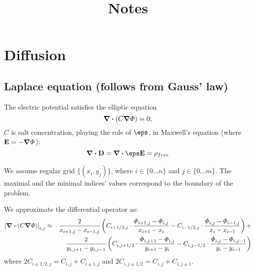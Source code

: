 

\title{Notes}

\maketitle
\section{Diffusion}
\subsection{Laplace equation (follows from Gauss' law)}
The electric potential satisfies the elliptic equation
\begin{equation}
	\boldsymbol{\nabla} \boldsymbol{\cdot} (C \boldsymbol{\nabla} \varPhi) = 0; \label{Phi eqn}
\end{equation}
$C$ is salt concentration, playing the role of $\eps$,
in Maxwell's equation (where $\mathbf{E} = -\boldsymbol{\nabla} \varPhi$):
\begin{equation}
\bnabla \bcdot \vect{D} = \bnabla \bcdot \eps \vect{E} = \rho_{free}
\end{equation}

We assume regular grid $\{(x_i, y_j)\}$,
where $i\in\{0 \ldots n\}$ and $j\in\{0 \ldots m\}$. The maximal and the
minimal indices' values correspond to the boundary of the problem.

We approximate the differential operator as:
\begin{eqnarray}
\left[ \boldsymbol{\nabla} \boldsymbol{\cdot} (C \boldsymbol{\nabla} \varPhi) \right]_{i,j}
&\approx &\frac{2}{x_{i+1,j} - x_{i-1,j}} \left(
C_{i+1/2,j} \cdot \frac{\varPhi_{i+1,j}-\varPhi_{i,j}}{x_{i+1}-x_{i}} -
C_{i-1/2,j} \cdot \frac{\varPhi_{i,j}-\varPhi_{i-1,j}}{x_{i}-x_{i-1}}
\right) + \\
&&\frac{2}{y_{i,j+1} - y_{i,j-1}} \left(C_{i,j+1/2} \cdot \frac{\varPhi_{i,j+1}-\varPhi_{i,j}}{y_{i+1}-y_{i}} -
C_{i,j-1/2} \cdot \frac{\varPhi_{i,j}-\varPhi_{i,j-1}}{y_{i}-y_{i-1}}
\right)
\end{eqnarray}
where $2C_{i\pm 1/2,j} = C_{i,j} + C_{i\pm 1,j}$ and
$2C_{i,j\pm 1/2} = C_{i,j} + C_{i,j\pm 1}$.

